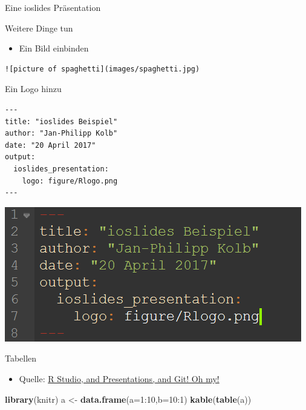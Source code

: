 \documentclass[ignorenonframetext,]{beamer}
\newenvironment{Shaded}{}{}
\newcommand{\KeywordTok}[1]{\textcolor[rgb]{0.00,0.44,0.13}{\textbf{{#1}}}}
\newcommand{\DataTypeTok}[1]{\textcolor[rgb]{0.56,0.13,0.00}{{#1}}}
\newcommand{\DecValTok}[1]{\textcolor[rgb]{0.25,0.63,0.44}{{#1}}}
\newcommand{\StringTok}[1]{\textcolor[rgb]{0.25,0.44,0.63}{{#1}}}
\newcommand{\NormalTok}[1]{{#1}}
\providecommand{\tightlist}{%
\setlength{\itemsep}{0pt}\setlength{\parskip}{0pt}}
\begin{document}
\begin{frame}[fragile]{Eine ioslides Präsentation}
\begin{block}{Weitere Dinge tun}
\begin{itemize}
\tightlist
\item
  Ein Bild einbinden
\end{itemize}

\begin{verbatim}
![picture of spaghetti](images/spaghetti.jpg)
\end{verbatim}

\end{block}

\begin{block}{Ein Logo hinzu}

\begin{verbatim}
---
title: "ioslides Beispiel"
author: "Jan-Philipp Kolb"
date: "20 April 2017"
output: 
  ioslides_presentation:
    logo: figure/Rlogo.png
---
\end{verbatim}

\includegraphics{./tex2pdf.9796/042adbdef801e8829eea31fc08de0770ac15f26a.png}

\end{block}

\begin{block}{Tabellen}

\begin{itemize}
\tightlist
\item
  Quelle:
  \href{https://www.r-bloggers.com/r-studio-and-presentations-and-git-oh-my/}{R
  Studio, and Presentations, and Git! Oh my!}
\end{itemize}

\begin{Shaded}
\begin{Highlighting}[]
\KeywordTok{library}\NormalTok{(knitr)}
\NormalTok{a <-}\StringTok{ }\KeywordTok{data.frame}\NormalTok{(}\DataTypeTok{a=}\DecValTok{1}\NormalTok{:}\DecValTok{10}\NormalTok{,}\DataTypeTok{b=}\DecValTok{10}\NormalTok{:}\DecValTok{1}\NormalTok{)}
\KeywordTok{kable}\NormalTok{(}\KeywordTok{table}\NormalTok{(a))}
\end{Highlighting}
\end{Shaded}


\end{block}
\end{frame}
\end{document}
